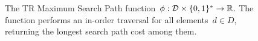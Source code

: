     \begin{figure}[h]
            \centering
            \begin{pcvstack}[boxed,center,space=0.5em]
            \end{pcvstack}
      \caption[Treap Maximum Search Path.]{The TR Maximum Search Path function~$\phi : \mathcal{D} \times \{0,1 \}^{*} \rightarrow  \mathbb{R}$. The function performs an in-order traversal for all elements~$d \in D$, returning the longest search path cost among them.
      } 
      \label{fig:t-cost}
\end{figure}
    
